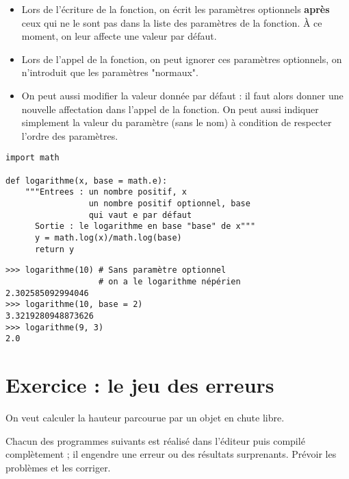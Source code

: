 \begin{itemize}
\item Lors de l'écriture de la fonction, on écrit les paramètres optionnels {\bf après} ceux qui ne le sont pas dans la liste des paramètres de la fonction. À ce moment, on leur affecte une valeur par défaut.
\item Lors de l'appel de la fonction, on peut ignorer ces paramètres optionnels, on n'introduit que les paramètres "normaux".
\item On peut aussi modifier la valeur donnée par défaut : il faut alors donner  une nouvelle affectation dans l'appel de la fonction. On peut aussi indiquer simplement la valeur du paramètre (sans le nom) à condition de respecter l'ordre des paramètres.
\end{itemize}
\begin{lstlisting}
import math 

def logarithme(x, base = math.e):
    """Entrees : un nombre positif, x
                 un nombre positif optionnel, base
                 qui vaut e par défaut
      Sortie : le logarithme en base "base" de x"""
      y = math.log(x)/math.log(base)
      return y
\end{lstlisting}
    
\begin{lstlisting}
>>> logarithme(10) # Sans paramètre optionnel 
                   # on a le logarithme népérien
2.302585092994046
>>> logarithme(10, base = 2)
3.3219280948873626
>>> logarithme(9, 3)
2.0
\end{lstlisting}
\section{Exercice : le jeu des erreurs}
On veut calculer la hauteur parcourue par un objet en chute libre.

Chacun des programmes suivants est réalisé dans l'éditeur puis compilé complètement ; il engendre une erreur ou des résultats surprenants. 
Prévoir les problèmes et les corriger.

